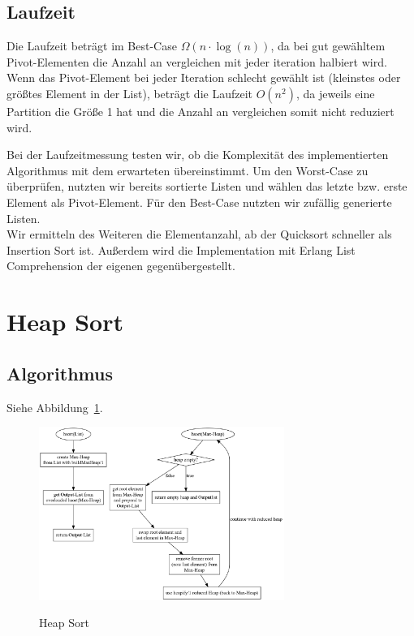 \documentclass[11pt]{article}
\begin{document}
    \subsection{Laufzeit}\label{subsec:Qlaufzeit}

    Die Laufzeit beträgt im Best-Case \(\Omega (n \cdot \log(n))\), da bei
    gut gewähltem Pivot-Elementen die Anzahl an vergleichen mit jeder
    iteration halbiert wird.
    Wenn das Pivot-Element bei jeder Iteration schlecht gewählt ist (kleinstes
    oder größtes Element in der List), beträgt die Laufzeit \(O(n^2)\), da
    jeweils eine Partition die Größe 1 hat und die Anzahl an vergleichen
    somit nicht reduziert wird.

    Bei der Laufzeitmessung testen wir, ob die Komplexität des implementierten
    Algorithmus mit dem erwarteten übereinstimmt.
    Um den Worst-Case zu überprüfen, nutzten wir bereits sortierte Listen und
    wählen das letzte bzw. erste Element als Pivot-Element.
    Für den Best-Case nutzten wir zufällig generierte Listen.\\
    Wir ermitteln des Weiteren die Elementanzahl, ab der Quicksort schneller
    als Insertion Sort ist.
    Außerdem wird die Implementation mit Erlang List Comprehension der
    eigenen gegenübergestellt.


    \section{Heap Sort}\label{sec:heap-sort}

    \subsection{Algorithmus}\label{subsec:Halgorithmus}
    Siehe Abbildung~\ref{fig:hsort}.


    \begin{figure}[hbt]
        \caption{Heap Sort}
        \centering
        \includegraphics[width = 8cm]{hsort.pdf}\label{fig:hsort}
    \end{figure}
\end{document}
